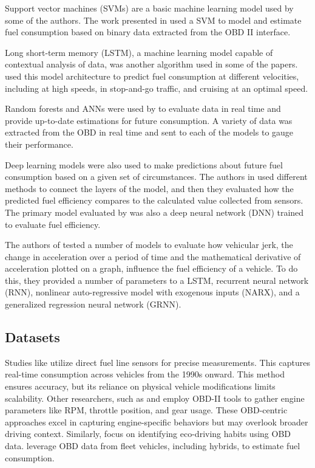 \documentclass[letterpaper]{article}
\begin{document}
Support vector machines (SVMs) are a basic machine learning model used by some of the authors. 
The work presented in \cite{abukhalil2020fuel} used a SVM to model and estimate fuel 
consumption based on binary data extracted from the OBD II interface. 

Long short-term memory (LSTM), a machine learning model capable of contextual analysis of data, 
was another algorithm used in some of the papers. \cite{wang2020fuelnet} used this
model architecture to predict fuel consumption at different velocities,
including at high speeds, in stop-and-go traffic, and cruising at an optimal
speed. 

Random forests and ANNs were used by \cite{abediasl2024real} to
evaluate data in real time and provide up-to-date estimations for future
consumption. A variety of data was extracted from the OBD in real time and sent
to each of the models to gauge their performance. 

Deep learning models were also used to make predictions about future fuel consumption 
based on a given set of circumstances. The authors in \cite{yen_combining_2021} used 
different methods to connect the layers of the model, and then they evaluated how the 
predicted fuel efficiency compares to the calculated value collected from sensors. The
primary model evaluated by \cite{topic2022neural} was also a deep neural
network (DNN) trained to evaluate fuel efficiency. 

The authors of \cite{zhang2023novel} tested a number of models to evaluate how vehicular 
jerk, the change in acceleration over a period of time and the mathematical derivative of 
acceleration plotted on a graph, influence the fuel efficiency of a vehicle. To do this, 
they provided a number of parameters to a LSTM, recurrent neural network (RNN), nonlinear 
auto-regressive model with exogenous inputs (NARX), and a generalized regression neural 
network (GRNN).


\subsection*{Datasets}

Studies like \cite{al2007experimental} utilize direct fuel line sensors for precise
measurements. This captures real-time consumption across vehicles from the 1990s onward. 
This method ensures accuracy, but its reliance on physical vehicle modifications limits 
scalability. Other researchers, such as \cite{rykala2023modeling} and \cite{abukhalil2020fuel} 
employ OBD-II tools to gather engine parameters like RPM, throttle position, and gear usage. 
These OBD-centric approaches excel in capturing engine-specific behaviors but may overlook 
broader driving context. Similarly, \cite{Manjunath2024} focus on identifying eco-driving 
habits using OBD data. \cite{abediasl2024real} leverage OBD data from fleet vehicles, 
including hybrids, to estimate fuel consumption. 
\end{document}
